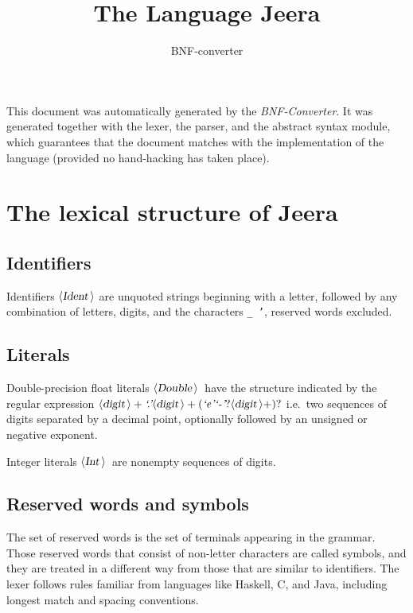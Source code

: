 \documentclass[a4paper,11pt]{article}
\author{BNF-converter}
\title{The Language Jeera}
\begin{document}
\maketitle

\newcommand{\emptyP}{\mbox{$\epsilon$}}
\newcommand{\terminal}[1]{\mbox{{\texttt {#1}}}}
\newcommand{\nonterminal}[1]{\mbox{$\langle \mbox{{\sl #1 }} \! \rangle$}}
\newcommand{\arrow}{\mbox{::=}}
\newcommand{\delimit}{\mbox{$|$}}
\newcommand{\reserved}[1]{\mbox{{\texttt {#1}}}}
\newcommand{\literal}[1]{\mbox{{\texttt {#1}}}}
\newcommand{\symb}[1]{\mbox{{\texttt {#1}}}}

This document was automatically generated by the {\em BNF-Converter}. It was generated together with the lexer, the parser, and the abstract syntax module, which guarantees that the document matches with the implementation of the language (provided no hand-hacking has taken place).

\section*{The lexical structure of Jeera}
\subsection*{Identifiers}
Identifiers \nonterminal{Ident} are unquoted strings beginning with a letter,
followed by any combination of letters, digits, and the characters {\tt \_ '},
reserved words excluded.


\subsection*{Literals}
Double-precision float literals \nonterminal{Double}\ have the structure
indicated by the regular expression $\nonterminal{digit}+ \mbox{{\it `.'}} \nonterminal{digit}+ (\mbox{{\it `e'}} \mbox{{\it `-'}}? \nonterminal{digit}+)?$ i.e.\
two sequences of digits separated by a decimal point, optionally
followed by an unsigned or negative exponent.


Integer literals \nonterminal{Int}\ are nonempty sequences of digits.




\subsection*{Reserved words and symbols}
The set of reserved words is the set of terminals appearing in the grammar. Those reserved words that consist of non-letter characters are called symbols, and they are treated in a different way from those that are similar to identifiers. The lexer follows rules familiar from languages like Haskell, C, and Java, including longest match and spacing conventions.
\end{document}
